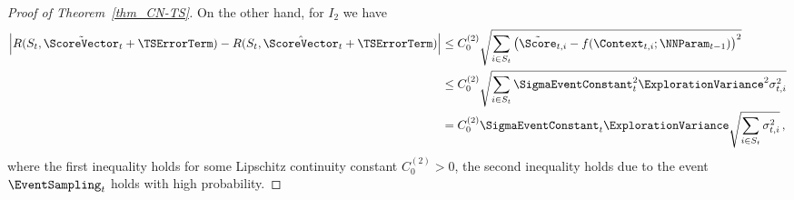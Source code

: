 \documentclass{article}
\theoremstyle{plain}
\begin{document}
\begin{proof}[Proof of Theorem~\ref{thm_CN-TS}]
On the other hand, for $I_2$ we have
    \begin{align*}
        \left| R(S_t, \tilde{\ScoreVector}_t + \boldsymbol{\TSErrorTerm}) - R(S_t, \hat{\ScoreVector}_t + \boldsymbol{\TSErrorTerm}) \right|
        & \le C_0^{(2)} \sqrt{ \sum_{i \in S_t} \left( \tilde{\Score}_{t,i} - f(\Context_{t,i};\NNParam_{t-1}) \right)^2 }
        \\
        & \le C_0^{(2)}
        \sqrt{ \sum_{i \in S_t} \SigmaEventConstant_t^2 \ExplorationVariance^2 \sigma_{t,i}^2 }
        \\
        & = C_0^{(2)} \SigmaEventConstant_t \ExplorationVariance \sqrt{ \sum_{i \in S_t} \sigma_{t,i}^2} \, ,
    \end{align*}
where the first inequality holds for some Lipschitz continuity constant $C_0^{(2)} > 0$, the second inequality holds due to the event $\EventSampling_t$ holds with high probability.


\end{proof}
\end{document}
